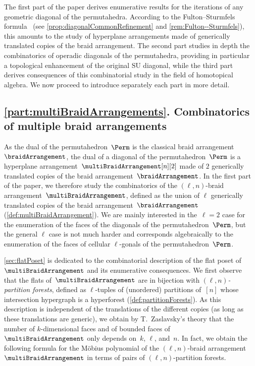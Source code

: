 \documentclass{amsart}
\theoremstyle{definition}
\newcommand{\SU}{\mathrm{SU}}
\begin{document}
The first part of the paper derives enumerative results for the iterations of any geometric diagonal of the permutahedra. 
According to the Fulton--Sturmfels formula~\cite{FultonSturmfels} (see \cref{prop:diagonalCommonRefinement} and \cref{rem:Fulton--Sturmfels}), this amounts to the study of hyperplane arrangements made of generically translated copies of the braid arrangement.
The second part studies in depth the combinatorics of operadic diagonals of the permutahedra, providing in particular a topological enhancement of the original $\SU$ diagonal, while the third part derives consequences of this combinatorial study in the field of homotopical algebra.
We now proceed to introduce separately each part in more detail.


\subsection*{\cref{part:multiBraidArrangements}. Combinatorics of multiple braid arrangements}

As the dual of the permutahedron~$\Perm$ is the classical braid arrangement~$\braidArrangement$, the dual of a diagonal of the permutahedron~$\Perm$ is a hyperplane arrangement~$\multiBraidArrangement[n][2]$ made of $2$ generically translated copies of the braid arrangement~$\braidArrangement$.
In the first part of the paper, we therefore study the combinatorics of the $(\ell,n)$-braid arrangement~$\multiBraidArrangement$, defined as the union of $\ell$ generically translated copies of the braid arrangement~$\braidArrangement$ (\cref{def:multiBraidArrangement}).
We are mainly interested in the~$\ell = 2$ case for the enumeration of the faces of the diagonals of the permutahedron~$\Perm$, but the general $\ell$ case is not much harder and corresponds algebraically to the enumeration of the faces of cellular $\ell$-gonals of the permutahedron~$\Perm$.

\cref{sec:flatPoset} is dedicated to the combinatorial description of the flat poset of~$\multiBraidArrangement$ and its enumerative consequences.
We first observe that the flats of~$\multiBraidArrangement$ are in bijection with \emph{$(\ell,n)$-partition forests}, defined as $\ell$-tuples of (unordered) partitions of~$[n]$ whose intersection hypergraph is a hyperforest (\cref{def:partitionForests}).
As this description is independent of the translations of the different copies (as long as these translations are generic), we obtain by T.~Zaslavsky's theory that the number of \mbox{$k$-dimensional} faces and of bounded faces of~$\multiBraidArrangement$ only depends on~$k$, $\ell$, and~$n$. %
In fact, we obtain the following formula for the M\"obius polynomial of the $(\ell,n)$-braid arrangement~$\multiBraidArrangement$ in terms of pairs of $(\ell,n)$-partition forests.
\end{document}
